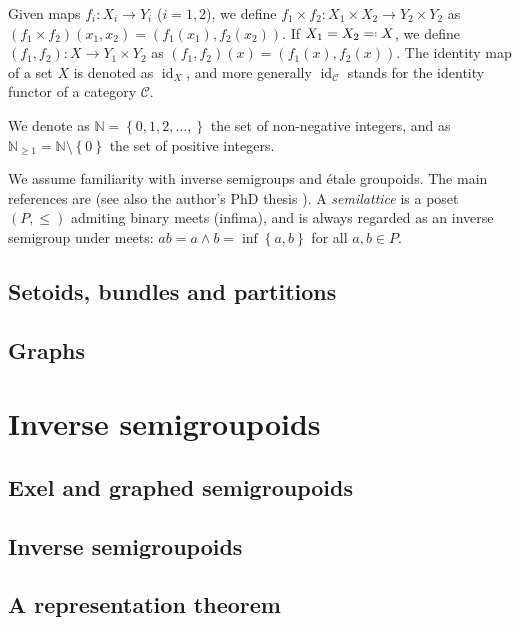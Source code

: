 \documentclass[a4paper]{amsart}
\theoremstyle{plain}    \newtheorem{theorem}[generalnumbering]{Theorem}
\theoremstyle{plain}    \newtheorem{corollary}[generalnumbering]{Corollary}
\theoremstyle{definition}   \newtheorem{definition}[generalnumbering]{Definition}
\theoremstyle{definition}   \newtheorem{example}[generalnumbering]{Example}
\theoremstyle{plain}    \newtheorem{proposition}[generalnumbering]{Proposition}
\theoremstyle{plain}    \newtheorem{lemma}[generalnumbering]{Lemma}
\theoremstyle{plain}    \newtheorem{plainstyle}[generalnumbering]{\namefordifferentenvironment}
\theoremstyle{plain}    \newtheorem*{plainstyle*}{\namefordifferentenvironment}
\theoremstyle{definition}    \newtheorem{definitionstyle}[generalnumbering]{\namefordifferentenvironment}
\theoremstyle{definition}    \newtheorem*{definitionstyle*}{\namefordifferentenvironment}
\DeclareMathOperator{\id}{id}
\newcommand*{\eqdef}{=\mathrel{\vcenter{\baselineskip0.5ex \lineskiplimit0pt\hbox{\scriptsize.}\hbox{\scriptsize.}}}}
\begin{document}
Given maps $f_i\colon X_i\to Y_i$ ($i=1,2$), we define $f_1\times f_2\colon X_1\times X_2\to Y_2\times Y_2$ as $(f_1\times f_2)(x_1,x_2)=(f_1(x_1),f_2(x_2))$. If $X_1=X_2\eqdef X$, we define $(f_1,f_2)\colon X\to Y_1\times Y_2$ as $(f_1,f_2)(x)=(f_1(x),f_2(x))$.
The identity map of a set $X$ is denoted as $\id_X$, and more generally $\id_{\mathcal{C}}$ stands for the identity functor of a category $\mathcal{C}$.

We denote as $\mathbb{N}=\left\{0,1,2,\ldots,\right\}$ the set of non-negative integers, and as $\mathbb{N}_{\geq 1}=\mathbb{N}\setminus\left\{0\right\}$ the set of positive integers.

We assume familiarity with inverse semigroups and étale groupoids. The main references are \cite{MR1694900,MR1724106} (see also the author's PhD thesis \cite{cordeirothesis}). A \emph{semilattice} is a poset $(P,\leq)$ admiting binary meets (infima), and is always regarded as an inverse semigroup under meets: $ab=a\land b=\inf\left\{a,b\right\}$ for all $a,b\in P$.

\subsection{Setoids, bundles and partitions}
    

\subsection{Graphs}
    
    
\section{Inverse semigroupoids}

\subsection{Exel and graphed semigroupoids}


\subsection{Inverse semigroupoids}


\subsection{A representation theorem}

\end{document}
